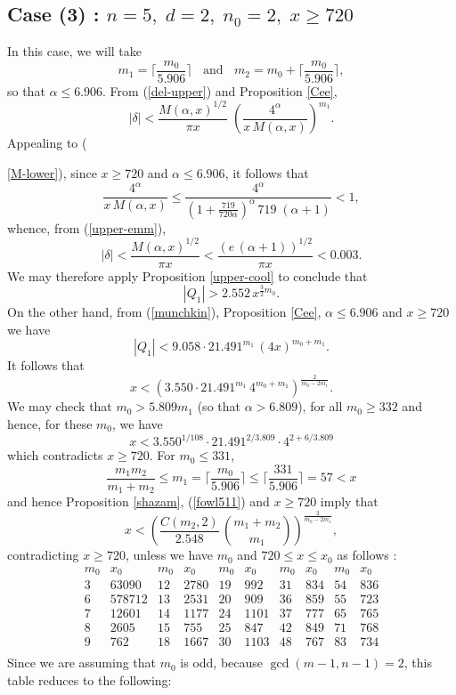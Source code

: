  
\subsection{Case (3) : $n=5, \; d=2, \;  n_0=2, \; x \geq 720$}

In this case, we will take
$$
m_1 = \Big\lceil \frac{m_0}{5.906} \Big\rceil \; \; \mbox{ and } \; \; m_2 = m_0+  \Big\lceil \frac{m_0}{5.906} \Big\rceil,
$$
so that $\alpha \leq 6.906$. 
From (\ref{del-upper}) and   Proposition \ref{Cee}, 
$$
|\delta| < \frac{M(\alpha,x)^{1/2}}{\pi x} \; \left( \frac{4^{\alpha} }{x \, M(\alpha,x)} \right)^{m_1}.
$$
Appealing to ({\ref{M-lower}), since $x \geq 720$ and $\alpha \leq 6.906$, it follows that 
$$
\frac{4^{\alpha} }{x \, M(\alpha,x)} \leq \frac{4^{\alpha} }{\left( 1 + \frac{719}{720 \alpha} \right)^\alpha \, 719 \; (\alpha+1)} < 1,
$$
whence, from (\ref{upper-emm}), 
$$
|\delta| < \frac{M(\alpha,x)^{1/2}}{\pi x} < \frac{(e \, (\alpha+1))^{1/2}}{\pi x}  < 0.003.
$$
We may therefore apply Proposition \ref{upper-cool} to conclude that
\begin{equation}\label{fowl511}
 |Q_1| > 2.552 \, x^{\frac{3}{2}m_0}.
\end{equation}
On the other hand, from (\ref{munchkin}), Proposition \ref{Cee}, $\alpha \leq 6.906$ and $x \geq 720$ we have
$$
|Q_1| < 9.058 \cdot 21.491^{m_1}  \, (4x)^{m_0+m_1}.
$$
 It follows that
\[
x < \left( 3.550 \cdot 21.491^{m_1}  \, 4^{m_0+m_1} \right)^{\frac{2}{m_0-2m_1}}.
\]
 We may check that $m_0>5.809 m_1$ (so that $\alpha>6.809$), for all $m_0 \geq 332$ and hence, for these $m_0$, we have 
 $$
 x < 3.550^{1/108} \cdot 21.491^{2/3.809} \cdot 4^{2+6/3.809}
 $$
 which contradicts  $x \geq 720$. For $m_0\leq 331$, 
$$
\frac{m_1m_2}{m_1+m_2} \leq m_1 = \Big\lceil \frac{m_0}{5.906} \Big\rceil \leq   \Big\lceil \frac{331}{5.906} \Big\rceil= 57 < x
$$
 and hence Proposition \ref{shazam}, (\ref{fowl511}) and $x \geq 720$ imply that
$$
x < \left( \frac{C(m_2, 2)}{2.548} \, \binom{m_1+m_2}{m_1} \right)^{\frac{2}{m_0-2m_1}},
$$
contradicting $x \geq 720$, unless  we have $m_0$ and $720 \leq x \leq x_0$ as follows :
$$
\begin{array}{cc|cc|cc|cc|cc} 
m_0 & x_0 & m_0 & x_0 & m_0 & x_0 & m_0 & x_0 & m_0 & x_0\\ \hline
3 & 63090 & 12 & 2780 & 19 & 992 & 31 & 834 & 54 & 836 \\
6 & 578712 & 13 & 2531 & 20 & 909 & 36 & 859 & 55 & 723 \\
7 & 12601 & 14 & 1177 & 24 & 1101 & 37 & 777 & 65 & 765\\
8 & 2605 & 15 & 755 & 25 & 847 & 42 & 849 & 71 & 768\\
9 & 762 & 18 & 1667 & 30 & 1103 & 48 & 767 & 83 & 734\\
\end{array}
$$
Since we are assuming that $m_0$ is odd, because $\gcd(m-1, n-1)=2$,  this table reduces to the following:

}
